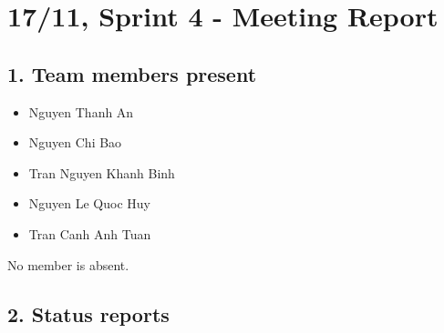 \documentclass[12pt]{article}
\begin{document}

\section{17/11, Sprint 4 - Meeting Report}

\subsection{1. Team members present}

\begin{itemize}

\item Nguyen Thanh An

\item Nguyen Chi Bao

\item Tran Nguyen Khanh Binh

\item Nguyen Le Quoc Huy

\item Tran Canh Anh Tuan

\end{itemize}

No member is absent.

\subsection{2. Status reports}
\end{document}
